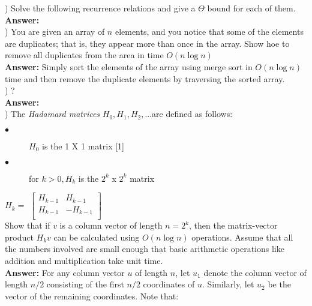\documentclass{article}
\begin{document}
\vspace{.3in}
) Solve the following recurrence relations and give a $\Theta$ bound for each of them.\\
\vspace{.1in}
{\bf Answer:} \\

\vspace{.3in}
) You are given an array of $n$ elements, and you notice that some of the elements are duplicates; that is, they appear more than once in the array. Show hoe to remove all duplicates from the area in time $O(n \log n)$\\
\vspace{.1in}
{\bf Answer:} Simply sort the elements of the array using merge sort in $O(n \log n)$ time and then remove the duplicate elements by traversing the sorted array.\\

\vspace{.3in}
) ?\\
\vspace{.1in}
{\bf Answer:} \\

\vspace{.3in}
) The \textit{Hadamard matrices} $H_{0}, H_{1}, H_{2}, $...are defined as follows: \\
\begin{description}
	\item[$\bullet$] $H_{0}$ is the 1 X 1 matrix [1]
	\item[$\bullet$] for $k > 0, H_{k}$ is the $2^k$ x $2^k$ matrix
\end{description}  
	
\indent \indent \indent \indent \indent \indent \indent \indent \indent $H_{k} = $
$\begin{bmatrix}
	H_{k - 1} & H_{k - 1} \\
	H_{k - 1} & -H_{k - 1} \\
\end{bmatrix}$ \\

\indent Show that if $v$ is a column vector of length $n = 2^k$, then the matrix-vector product $H_{k}v$ can be calculated using $O(n \log n)$ operations. Assume that all the numbers involved are small enough that basic arithmetic operations like addition and multiplication take unit time. \\
\vspace{.1in}
{\bf Answer:} For any column vector $u$ of length $n$, let $u_{1}$ denote the column vector of length $n/2$ consisting of the first $n/2$ coordinates of $u$. Similarly, let $u_{2}$ be the vector of the remaining coordinates. Note that: \\
\end{document}
